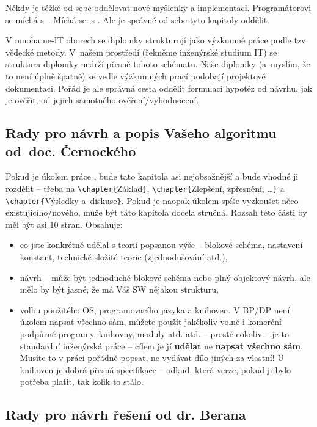 Někdy je těžké od sebe oddělovat nové myšlenky a implementaci. Programátorovi se míchá  s~. Míchá se:  s . Ale je správně od sebe tyto kapitoly oddělit.

V mnoha ne-IT oborech se diplomky strukturují jako výzkumné práce podle tzv. vědecké metody. V~našem prostředí (řekněme inženýrské studium IT) se struktura diplomky nedrží přesně tohoto schématu. Naše diplomky (a~myslím, že to není úplně špatně) se vedle výzkumných prací podobají projektové dokumentaci. Pořád je ale správná cesta oddělit formulaci hypotéz od návrhu, jak je ověřit, od jejich samotného ověření/vyhodnocení.

\subsection*{Rady pro návrh a popis Vašeho algoritmu od~doc. Černockého}

Pokud je úkolem práce , bude tato kapitola asi nejobsažnější a bude vhodné ji rozdělit -- třeba na \texttt{\textbackslash chapter\{}Základ\texttt{\}}, \texttt{\textbackslash chapter\{}Zlepšení, zpřesnění, \ldots\texttt{\}} a \texttt{\textbackslash chapter\{}Výsledky a~diskuse\texttt{\}}. Pokud je naopak úkolem spíše vyzkoušet něco existujícího/nového, může být táto kapitola docela stručná. Rozsah této části by měl být asi 10 stran. Obsahuje:
\begin{itemize}
  \item{co jste konkrétně udělal s teorií popsanou výše -- blokové schéma, nastavení konstant, technické  složité teorie (zjednodušování atd.),}
  \item{návrh -- může být jednoduché blokové schéma nebo plný objektový návrh, ale mělo by být jasné, že má Váš SW nějakou strukturu,}
  \item{volbu použitého OS, programovacího jazyka a knihoven. V BP/DP není úkolem napsat všechno sám, můžete použít jakékoliv volné i komerční podpůrné programy, knihovny, moduly atd. atd. -- prostě cokoliv -- je to standardní inženýrská práce -- cílem je jí \textbf{udělat} ne \textbf{napsat všechno sám}. Musíte to v práci pořádně popsat, ne vydávat dílo jiných za vlastní! U knihoven je dobrá přesná specifikace -- odkud, která verze, pokud ji bylo potřeba platit, tak kolik to stálo.}
\end{itemize}

\subsection*{Rady pro návrh řešení od dr. Berana}

